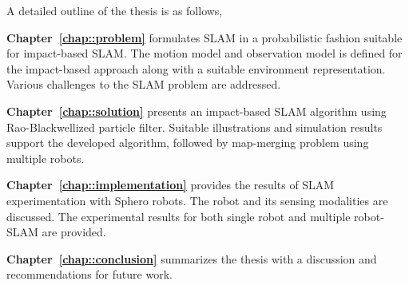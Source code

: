 A detailed outline of the thesis is as follows,

\textbf{Chapter~\ref{chap::problem}} formulates SLAM in a probabilistic fashion suitable for impact-based SLAM. The motion model and observation model is defined for the impact-based approach along with a suitable environment representation. Various challenges to the SLAM problem are addressed.

\textbf{Chapter~\ref{chap::solution}} presents an impact-based SLAM algorithm using Rao-Blackwellized particle filter. Suitable illustrations and simulation results support the developed algorithm, followed by map-merging problem using multiple robots.

\textbf{Chapter~\ref{chap::implementation}} provides the results of SLAM experimentation with Sphero robots. The robot and its sensing modalities are discussed. The experimental results for both single robot and multiple robot-SLAM are provided.

\textbf{Chapter~\ref{chap::conclusion}} summarizes the thesis with a discussion and recommendations for future work.  